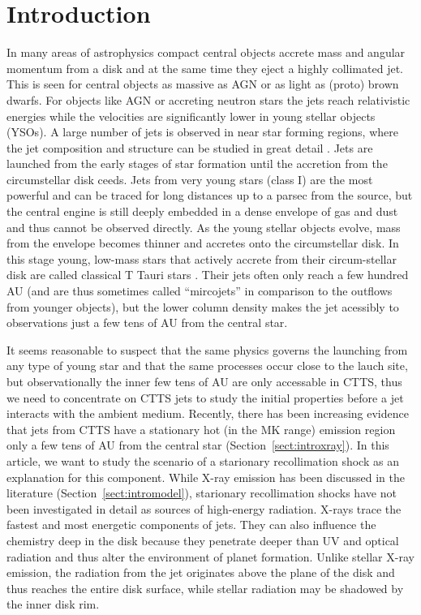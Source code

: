 \section{Introduction} 
In many areas of astrophysics compact central objects accrete mass and angular momentum from a disk and at the same time they eject a highly collimated jet. This is seen for central objects as massive as AGN or as light as (proto) brown dwarfs. For objects like AGN or accreting neutron stars the jets reach relativistic energies while the velocities are significantly lower in young stellar objects (YSOs). 
A large number of jets is observed in near star forming regions, where the jet composition and structure can be studied in great detail \citep[see the review by][]{2014arXiv1402.3553F}.
Jets are launched from the early stages of star formation until the accretion from the circumstellar disk ceeds. Jets from very young stars (class I) are the most powerful and can be traced for long distances up to a parsec from the source, but the central engine is still deeply embedded in a dense envelope of gas and dust and thus cannot be observed directly. As the young stellar objects evolve, mass from the envelope becomes thinner and accretes onto the circumstellar disk. In this stage young, low-mass stars that actively accrete from their circum-stellar disk are called classical T Tauri stars \citep[for a review see][]{2013AN....334...67G}. Their jets often only reach a few hundred AU (and are thus sometimes called ``mircojets'' in comparison to the outflows from younger objects), but the lower column density makes the jet acessibly to observations just a few tens of AU from the central star.

It seems reasonable to suspect that the same physics governs the launching from any type of young star and that the same processes occur close to the lauch site, but observationally the inner few tens of AU are only accessable in CTTS, thus we need to concentrate on CTTS jets to study the initial properties before a jet interacts with the ambient medium. Recently, there has been increasing evidence that jets from CTTS have a stationary hot (in the MK range) emission region only a few tens of AU from the central star (Section~\ref{sect:introxray}). In this article, we want to study the scenario of a starionary recollimation shock as an explanation for this component. While X-ray emission has been discussed in the literature (Section~\ref{sect:intromodel}), starionary recollimation shocks have not been investigated in detail as sources of high-energy radiation. X-rays trace the fastest and most energetic components of jets. They can also influence the chemistry deep in the disk \citep[e.g.][]{2010ApJ...714.1511H,2012ApJ...756..157G} because they penetrate deeper than UV and optical radiation and thus alter the environment of planet formation. Unlike stellar X-ray emission, the radiation from the jet originates above the plane of the disk and thus reaches the entire disk surface, while stellar radiation may be shadowed by the inner disk rim.

